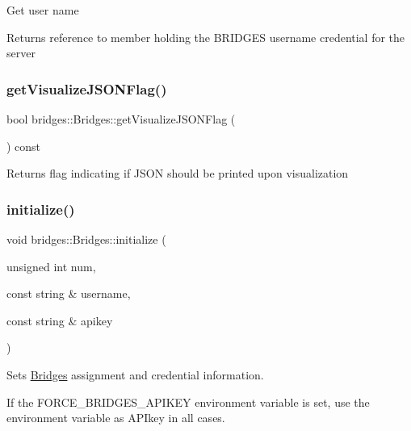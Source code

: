 Get user name \begin{DoxyReturn}{Returns}
reference to member holding the B\+R\+I\+D\+G\+ES username credential for the server 
\end{DoxyReturn}
\mbox{\label{classbridges_1_1_bridges_a6c2897b19a25989e09c031152a74317d}} 
\subsubsection{\texorpdfstring{getVisualizeJSONFlag()}{getVisualizeJSONFlag()}}
{\footnotesize\ttfamily bool bridges\+::\+Bridges\+::get\+Visualize\+J\+S\+O\+N\+Flag (\begin{DoxyParamCaption}{ }\end{DoxyParamCaption}) const\hspace{0.3cm}{\ttfamily [inline]}}

\begin{DoxyReturn}{Returns}
flag indicating if J\+S\+ON should be printed upon visualization 
\end{DoxyReturn}
\mbox{\label{classbridges_1_1_bridges_a507ee9983331d23829cfc60fd13ead78}} 
\subsubsection{\texorpdfstring{initialize()}{initialize()}}
{\footnotesize\ttfamily void bridges\+::\+Bridges\+::initialize (\begin{DoxyParamCaption}\item[{unsigned int}]{num,  }\item[{const string \&}]{username,  }\item[{const string \&}]{apikey }\end{DoxyParamCaption})\hspace{0.3cm}{\ttfamily [inline]}}



Sets \mbox{\hyperlink{classbridges_1_1_bridges}{Bridges}} assignment and credential information. 

If the F\+O\+R\+C\+E\+\_\+\+B\+R\+I\+D\+G\+E\+S\+\_\+\+A\+P\+I\+K\+EY environment variable is set, use the environment variable as A\+P\+Ikey in all cases.

